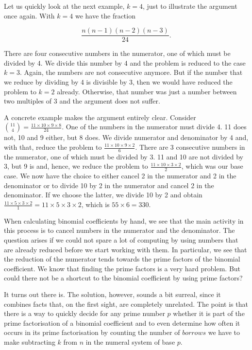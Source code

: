 \documentclass[tikz]{scrreprt}
\begin{document}
Let us quickly look at the next example, $k=4$,
just to illustrate the argument once again.
With $k=4$ we have the fraction

\[
\frac{n(n-1)(n-2)(n-3)}{24}.
\]

There are four consecutive numbers in the numerator,
one of which must be divided by 4. We divide this number
by 4 and the problem is reduced to the case $k=3$.
Again, the numbers are not consecutive anymore.
But if the number that we reduce by dividing by 4
is divisible by 3, then we would have reduced
the problem to $k=2$ already. Otherwise, that
number was just a number between two multiples of
3 and the argument does not suffer.

A concrete example makes the argument entirely clear.
Consider $\binom{11}{4} = \frac{11\times 10 \times 9 \times 8}{24}$.
One of the numbers in the numerator must divide 4.
11 does not, 10 and 9 either, but 8 does.
We divide numerator and denominator by 4 and,
with that, reduce the problem to 
$\frac{11\times 10 \times 9 \times 2}{6}$.
There are 3 consecutive numbers in the numerator,
one of which must be divided by 3.
11 and 10 are not divided by 3,
but 9 is and, hence, we reduce the problem to
$\frac{11\times 10 \times 3 \times 2}{2}$,
which was our base case. 
We now have the choice to either cancel 2
in the numerator and 2 in the denominator
or to divide 10 by 2 in the numerator and
cancel 2 in the denominator.
If we choose the latter,
we divide 10 by 2 and obtain
$\frac{11\times 5 \times 3 \times 2}{1} = 11 \times 5 \times 3 \times 2$,
which is $55 \times 6 = 330$.

When calculating binomial coefficients by hand,
we see that the main activity in this process
is to cancel numbers in the numerator and the
denominator.
The question arises if we could not spare
a lot of computing by using numbers
that are already reduced before we start working with them.
In particular, we see that the reduction
of the numerator tends towards the prime
factors of the binomial coefficient.
We know that finding the prime factors
is a very hard problem.
But could there not be a 
shortcut to the binomial coefficient
by using prime factors?

It turns out there is.
The solution, however,
sounds a bit surreal,
since it combines facts
that, on the first sight, are completely
unrelated.
The point is that there is a way
to quickly decide for any
prime number $p$ whether it is part
of the prime factorisation of a 
binomial coefficient and
to even determine how often it occurs
in its prime factorisation by counting
the number of $borrows$ we have to make
subtracting $k$ from $n$ in the numeral system
of base $p$.
\end{document}
